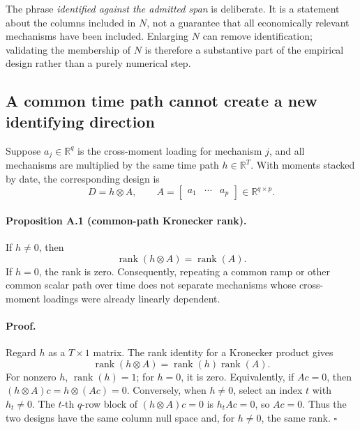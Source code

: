 The phrase \emph{identified against the admitted span} is deliberate. It is a
statement about the columns included in \(N\), not a guarantee that all
economically relevant mechanisms have been included. Enlarging \(N\) can
remove identification; validating the membership of \(N\) is therefore a
substantive part of the empirical design rather than a purely numerical step.

\subsection{A common time path cannot create a new identifying direction}
\label{app:common-path}

Suppose \(a_j\in\mathbb R^q\) is the cross-moment loading for mechanism \(j\),
and all mechanisms are multiplied by the same time path
\(h\in\mathbb R^T\). With moments stacked by date, the corresponding design is
\begin{equation}
  D=h\otimes A,
  \qquad
  A=\begin{bmatrix}a_1&\cdots&a_p\end{bmatrix}
  \in\mathbb R^{q\times p}.
  \label{eq:common-path-design}
\end{equation}

\paragraph{Proposition A.1 (common-path Kronecker rank).}
If \(h\neq0\), then
\begin{equation}
  \operatorname{rank}(h\otimes A)=\operatorname{rank}(A).
  \label{eq:kronecker-rank}
\end{equation}
If \(h=0\), the rank is zero. Consequently, repeating a common ramp or other
common scalar path over time does not separate mechanisms whose cross-moment
loadings were already linearly dependent.

\paragraph{Proof.}
Regard \(h\) as a \(T\times1\) matrix. The rank identity for a Kronecker
product gives
\[
  \operatorname{rank}(h\otimes A)
  =\operatorname{rank}(h)\operatorname{rank}(A).
\]
For nonzero \(h\), \(\operatorname{rank}(h)=1\); for \(h=0\), it is zero.
Equivalently, if \(Ac=0\), then
\((h\otimes A)c=h\otimes(Ac)=0\). Conversely, when \(h\neq0\), select an
index \(t\) with \(h_t\neq0\). The \(t\)-th \(q\)-row block of
\((h\otimes A)c=0\) is \(h_tAc=0\), so \(Ac=0\). Thus the two designs have
the same column null space and, for \(h\neq0\), the same rank.
\(\square\)

